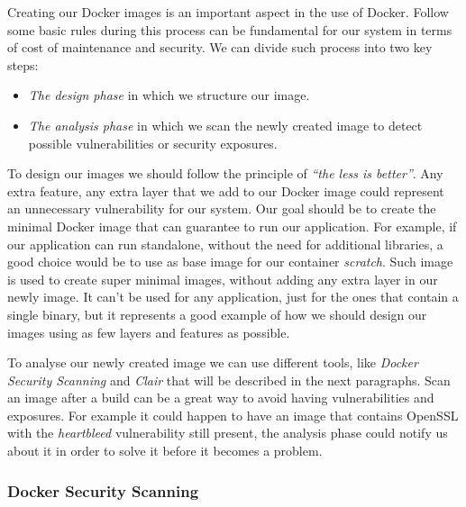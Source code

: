 \documentclass[a4paper,12pt]{article}
\begin{document}
Creating our Docker images is an important aspect in the use of Docker. Follow
some basic rules during this process can be fundamental for our system in terms
of cost of maintenance and security. We can divide such process into two key
steps: 
\begin{itemize}
  \item \textit{The design phase} in which we structure our image.
  \item \textit{The analysis phase} in which we scan the newly created image to
  detect possible vulnerabilities or security exposures.
\end{itemize}
To design our images we should follow the principle of \textit{``the less is
better''}. Any extra feature, any extra layer that we add to our Docker image
could represent an unnecessary vulnerability for our system. Our goal should be
to create the minimal Docker image that can guarantee to run our application.
For example, if our application can run standalone, without the need for
additional libraries, a good choice would be to use as base image for our
container \textit{scratch}. Such image is used to create super minimal images,
without adding any extra layer in our newly image. It can't be used for any
application, just for the ones that contain a single binary, but it represents a
good example of how we should design our images using as few layers and features
as possible. \par To analyse our newly created image we can use different tools,
like \textit{Docker Security Scanning} and \textit{Clair} that will be described
in the next paragraphs. Scan an image after a build can be a great way to avoid
having vulnerabilities and exposures. For example it could happen to have an
image that contains OpenSSL with the \textit{heartbleed} vulnerability still
present, the analysis phase could notify us about it in order to solve it before
it becomes a problem. 

\subsubsection{Docker Security Scanning}
\end{document}
